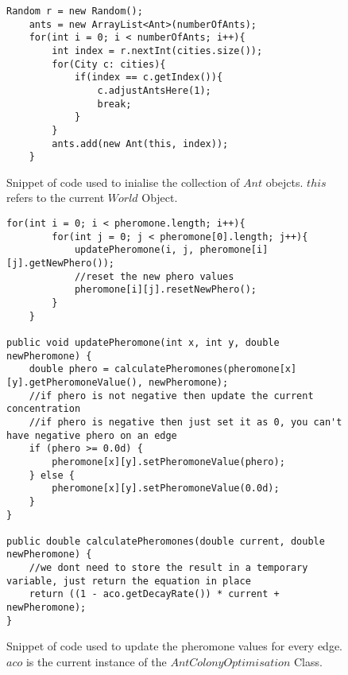 \begin{figure}[H]
\begin{lstlisting}
Random r = new Random();
	ants = new ArrayList<Ant>(numberOfAnts);
	for(int i = 0; i < numberOfAnts; i++){
		int index = r.nextInt(cities.size());
		for(City c: cities){
			if(index == c.getIndex()){
				c.adjustAntsHere(1);
				break;
			}
		}
		ants.add(new Ant(this, index));
	}
\end{lstlisting}
\caption{Snippet of code used to inialise the collection of $Ant$ obejcts. $this$ refers to the current $World$ Object.}
\label{initAnt}
\end{figure}

\begin{figure}[H]
\begin{lstlisting}
for(int i = 0; i < pheromone.length; i++){
		for(int j = 0; j < pheromone[0].length; j++){
			updatePheromone(i, j, pheromone[i][j].getNewPhero());
			//reset the new phero values
			pheromone[i][j].resetNewPhero();
		}
	}

public void updatePheromone(int x, int y, double newPheromone) {
	double phero = calculatePheromones(pheromone[x][y].getPheromoneValue(), newPheromone);
	//if phero is not negative then update the current concentration
	//if phero is negative then just set it as 0, you can't have negative phero on an edge
	if (phero >= 0.0d) {
		pheromone[x][y].setPheromoneValue(phero);
	} else {
		pheromone[x][y].setPheromoneValue(0.0d);
	}
}

public double calculatePheromones(double current, double newPheromone) {
	//we dont need to store the result in a temporary variable, just return the equation in place
	return ((1 - aco.getDecayRate()) * current + newPheromone);
}	
\end{lstlisting}
\caption{Snippet of code used to update the pheromone values for every edge. $aco$ is the current instance of the $AntColonyOptimisation$ Class.}
\label{codephero}
\end{figure}

